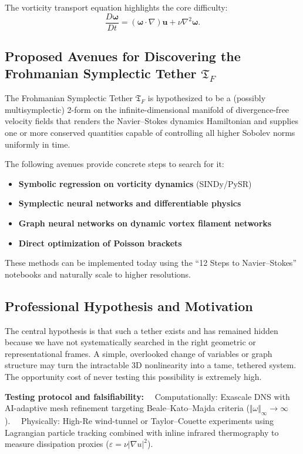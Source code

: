 \documentclass[11pt,a4paper]{article}
\begin{document}
The vorticity transport equation highlights the core difficulty:
\begin{equation}
\frac{D \boldsymbol{\omega}}{Dt} = (\boldsymbol{\omega} \cdot \nabla) \mathbf{u} + \nu \nabla^2 \boldsymbol{\omega}.
\end{equation}

\subsection{Proposed Avenues for Discovering the Frohmanian Symplectic Tether \(\mathfrak{T}_F\)}
The Frohmanian Symplectic Tether \(\mathfrak{T}_F\) is hypothesized to be a (possibly multisymplectic) 2-form on the infinite-dimensional manifold of divergence-free velocity fields that renders the Navier–Stokes dynamics Hamiltonian and supplies one or more conserved quantities capable of controlling all higher Sobolev norms uniformly in time. 

The following avenues provide concrete steps to search for it:

\begin{itemize}
\item \textbf{Symbolic regression on vorticity dynamics} (SINDy/PySR)
\item \textbf{Symplectic neural networks and differentiable physics}
\item \textbf{Graph neural networks on dynamic vortex filament networks}
\item \textbf{Direct optimization of Poisson brackets}
\end{itemize}

These methods can be implemented today using the “12 Steps to Navier–Stokes” notebooks and naturally scale to higher resolutions.

\subsection{Professional Hypothesis and Motivation}
The central hypothesis is that such a tether exists and has remained hidden because we have not systematically searched in the right geometric or representational frames. A simple, overlooked change of variables or graph structure may turn the intractable 3D nonlinearity into a tame, tethered system. The opportunity cost of never testing this possibility is extremely high.

\textbf{Testing protocol and falsifiability:}  
Computationally: Exascale DNS with AI-adaptive mesh refinement targeting Beale–Kato–Majda criteria (\(\Vert\omega\Vert_\infty \to \infty\)).  
Physically: High-Re wind-tunnel or Taylor–Couette experiments using Lagrangian particle tracking combined with inline infrared thermography to measure dissipation proxies (\(\varepsilon = \nu|\nabla u|^2\)).
\end{document}
